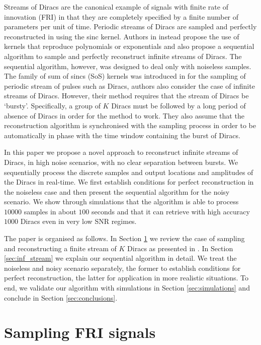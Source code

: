 \documentclass{article}
\begin{document}
Streams of Diracs are  the canonical example of signals with finite rate of innovation 
(FRI) in that they are completely specified by a finite number of parameters per unit of time. 
Periodic streams of Diracs are sampled and perfectly reconstructed in 
\cite{vetterli2002} using the sinc kernel.  
Authors in \cite{dragotti2005,dragotti2007} instead propose the use of kernels that reproduce 
polynomials or exponentials and also propose a sequential algorithm 
to sample and perfectly reconstruct infinite streams of Diracs. The sequential algorithm, 
however,  was designed to deal only with noiseless samples.
The family of sum of sincs (SoS) kernels was introduced in \cite{tur2011} 
for the sampling of periodic stream of pulses such as Diracs, authors also consider the
case of infinite streams of Diracs. However, their method requires that the 
stream of Diracs be `bursty'. Specifically, a group of $K$ Diracs must be followed
by a long period of absence of Diracs in order for the method to work. 
They also assume that the reconstruction algorithm is synchronised with the sampling process in order to 
be automatically in phase with the time window containing the burst of Diracs.

In this paper we propose a novel 
approach to reconstruct infinite streams of Diracs, in high 
noise scenarios, with no clear separation between bursts. 
We sequentially process the discrete samples and output locations and amplitudes
of the Diracs in real-time.
We first establish conditions for perfect reconstruction in the noiseless case
and then present the sequential algorithm for the noisy scenario.
We show through simulations  that the algorithm is able to process $10000$ 
samples in about $100$ seconds and that it can retrieve with high accuracy 
$1000$ Diracs even in very low SNR regimes.

The paper is organised as follows. In Section \ref{sec:sampling} 
we review the case of sampling and reconstructing a finite stream of $K$ 
Diracs as presented in \cite{dragotti2007}. 
In Section \ref{sec:inf_stream} we explain our 
sequential algorithm in detail. We treat the noiseless and noisy scenario 
separately, the former to establish conditions for perfect reconstruction, 
the latter for application in more realistic situations. To end, we validate 
our algorithm with simulations in Section \ref{sec:simulations} and conclude 
in Section \ref{sec:conclusions}.


\section{Sampling FRI signals}
\label{sec:sampling}
\end{document}
